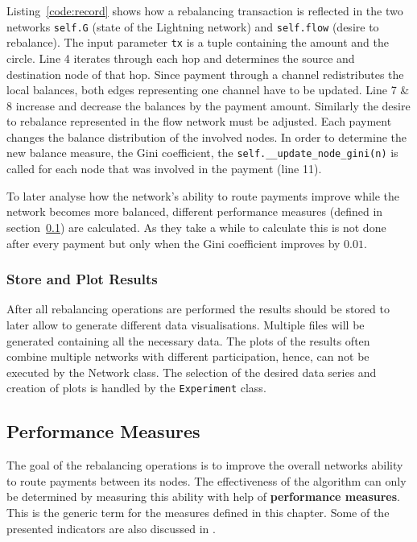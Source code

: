 \documentclass[final]{fhnwreport}       %
\begin{document}
Listing~\ref{code:record} shows how a rebalancing transaction is reflected in the two networks \texttt{self.G} (state of the Lightning network) and \texttt{self.flow} (desire to rebalance). The input parameter \texttt{tx} is a tuple containing the amount and the circle. Line 4 iterates through each hop and determines the source and destination node of that hop. Since payment through a channel redistributes the local balances, both edges representing one channel have to be updated. Line 7 \& 8 increase and decrease the balances by the payment amount. Similarly the desire to rebalance represented in the flow network must be adjusted. Each payment changes the balance distribution of the involved nodes. In order to determine the new balance measure, the Gini coefficient, the \texttt{self.__update_node_gini(n)} is called for each node that was involved in the payment (line 11).

To later analyse how the network's ability to route payments improve while the network becomes more balanced, different performance measures (defined in section~\ref{sub:perfm}) are calculated. As they take a while to calculate this is not done after every payment but only when the Gini coefficient improves by $0.01$.

\subsubsection{Store and Plot Results}
After all rebalancing operations are performed the results should be stored to later allow to generate different data visualisations. Multiple files will be generated containing all the necessary data. The plots of the results often combine multiple networks with different participation, hence, can not be executed by the Network class. The selection of the desired data series and creation of plots is handled by the \texttt{Experiment} class.

\subsection{Performance Measures}\label{sub:perfm}
The goal of the rebalancing operations is to improve the overall networks ability to route payments between its nodes. The effectiveness of the algorithm can only be determined by measuring this ability with help of \textbf{performance measures}. This is the generic term for the measures defined in this chapter. Some of the presented indicators are also discussed in \cite{pickhardt_evaluating_2020}. 
\end{document}
